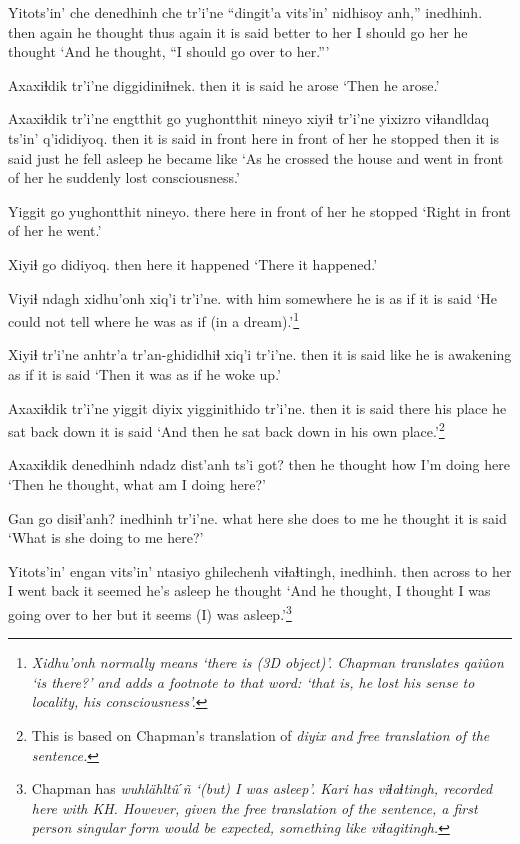 \documentclass[12pt]{article}
\begin{document}
\gll Yitots'in' che denedhinh che tr'i'ne ``dingit'a vits'in' nidhisoy anh,''  inedhinh.
then  again {he thought thus} again {it is said} better {to her} {I should go} her {he thought}
\glt `And he thought, ``I should go over to her.'''
\glend

\gll Axaxiɬdik tr'i'ne diggidiniɬnek.
then  {it is said} {he arose}
\glt `Then he arose.'
\glend

\gll Axaxiɬdik tr'i'ne engtthit go yughontthit nineyo xiyiɬ tr'i'ne yixizro viɬandldaq ts'in' q'ididiyoq.
then  {it is said} {in front}  here {in front of her} {he stopped} then {it is said} just {he fell asleep} {} {he became like}
\glt `As he crossed the house and went in front of her he suddenly lost consciousness.'
\glend

\gll Yiggit go yughontthit nineyo.
there here {in front of her} {he stopped}
\glt `Right in front of her he went.'
\glend

\gll Xiyiɬ go didiyoq.
then  here {it happened}
\glt `There it happened.'
\glend

\gll Viyiɬ  ndagh xidhu'onh  xiq'i tr'i'ne.
{with him} somewhere {he is} {as if} {it is said}
\glt `He could not tell where he was as if (in a dream).'\footnote{\em Xidhu'onh \em normally means `there is (3D object)'. Chapman translates \em qai\dh \^uon \em `is there?' and adds a footnote to that word:  `that is, he lost his sense to locality, his consciousness'.}
\glend

\gll Xiyiɬ tr'i'ne anhtr'a tr'an-ghididhiɬ xiq'i tr'i'ne.
then {it is said} like {he is awakening} {as if} {it is said}
\glt `Then it was as if he woke up.'
\glend

\gll Axaxiɬdik tr'i'ne yiggit diyix  yigginithido  tr'i'ne.
then  {it is said} there {his place} {he sat back down} {it is said}
\glt `And then he sat back down in his own place.'\footnote{This is based on Chapman's translation of \em diyix \em and free translation of the sentence.}
\glend

\gll Axaxiɬdik denedhinh ndadz dist'anh ts'i got?
then  {he thought} how {I'm doing} {} here
\glt `Then he thought, what am I doing here?'
\glend

\gll Gan go disiɬ'anh?  inedhinh tr'i'ne.
what here {she does to me} {he thought} {it is said}
\glt `What is she doing to me here?'
\glend

\gll Yitots'in' engan vits'in' ntasiyo ghilechenh viɬaɬtingh, inedhinh.
then  across  {to her} {I went back} {it seemed} {he's asleep} {he thought}
\glt `And he thought, I thought I was going over to her but it seems (I) was asleep.'\footnote{Chapman has \em wuhl\"ahlt\^uˊ\~n \em `(but) I was asleep'. Kari has \em viɬaɬtingh, \em recorded here with KH. However, given the free translation of the sentence, a first person singular form would be expected, something like \em viɬagitingh.}
\glend
\end{document}
